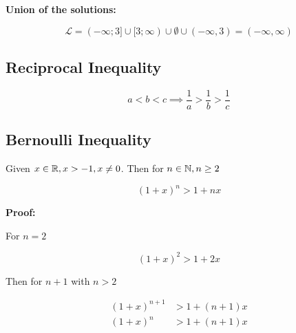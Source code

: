 \textbf{Union of the solutions:}

\[
    \mathcal{L} = 
    (-\infty; 3] \cup 
    [3; \infty ) \cup 
    \emptyset    \cup
    (- \infty, 3) = (- \infty, \infty)
\]

\subsection{Reciprocal Inequality}

\[
    a < b < c \implies \frac{1}{a} > \frac{1}{b} > \frac{1}{c}
\]

\subsection{Bernoulli Inequality}

Given \(x \in \mathbb{R}, x > -1, x \ne 0\). Then for \(n \in \mathbb{N}, n \ge 2\)

\[
    (1 + x)^n > 1 + nx
\]

\textbf{Proof:}

For \(n = 2\)

\[
    (1 + x)^2 > 1 + 2x
\]

Then for \(n + 1\) with \(n > 2\)

\begin{align*}
    (1 + x)^{n + 1} &> 1 + (n + 1)x \\
    (1 + x)^n &> 1 + (n + 1)x
\end{align*}

\QED

